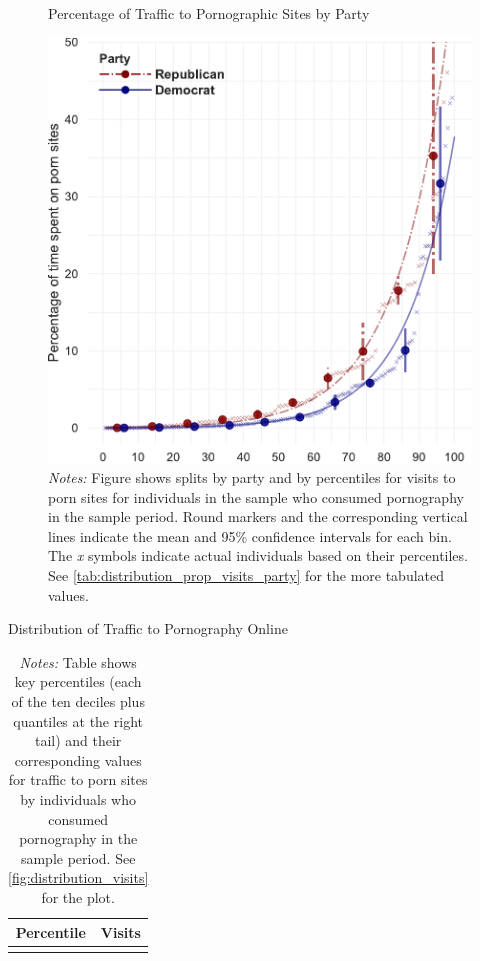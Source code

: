 \documentclass[12pt, letterpaper]{article}
\begin{document}
\begin{figure}
	\centering
	\caption{Percentage of Traffic to Pornographic Sites by Party}
	\includegraphics[width=.55\linewidth]{../figs/distribution_proportion_visits_to_adultsites_by_party.pdf}
	\caption*{\footnotesize \emph{Notes:} 
		Figure shows splits by party and by percentiles for visits to porn sites for individuals in the sample who consumed pornography in the sample period.
		Round markers and the corresponding vertical lines indicate the mean and 95\% confidence intervals for each bin.
		The \emph{x} symbols indicate actual individuals based on their percentiles.
		See \cref{tab:distribution_prop_visits_party} for the more tabulated values.
	}
	\label{fig:distribution_prop_visits_party}
\end{figure}



\begin{table} \centering \small \setlength\tabcolsep{10 pt}
	\caption{Distribution of Traffic to Pornography Online}
	\label{tab:distribution_visits}
	\begin{adjustbox}{max width=\textwidth}
		\begin{tabular}{cr}
			\toprule
			\multicolumn{1}{c}{\textbf{Percentile}}&\multicolumn{1}{c}{\textbf{Visits}}\\
			\midrule
			\\
			\bottomrule
		\end{tabular}
	\end{adjustbox}
	\caption*{\footnotesize \emph{Notes:} 
		Table shows key percentiles (each of the ten deciles plus quantiles at the right tail) and their corresponding values for traffic to porn sites by individuals who consumed pornography in the sample period. 
		See \cref{fig:distribution_visits} for the plot.
	}
\end{table}
\end{document}
